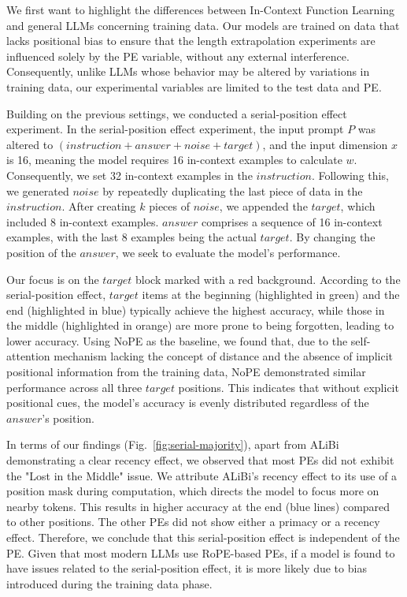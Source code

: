 \documentclass[letterpaper]{article} %
\begin{document}
We first want to highlight the differences between In-Context Function Learning and general LLMs concerning training data. Our models are trained on data that lacks positional bias to ensure that the length extrapolation experiments are influenced solely by the PE variable, without any external interference. Consequently, unlike LLMs whose behavior may be altered by variations in training data, our experimental variables are limited to the test data and PE.

Building on the previous settings, we conducted a serial-position effect experiment. In the serial-position effect experiment, the input prompt $P$ was altered to $(instruction + answer + noise + target)$, and the input dimension $x$ is 16, meaning the model requires 16 in-context examples to calculate $w$. Consequently, we set 32 in-context examples in the $instruction$. Following this, we generated $noise$ by repeatedly duplicating the last piece of data in the $instruction$. After creating $k$ pieces of $noise$, we appended the $target$, which included 8 in-context examples. $answer$ comprises a sequence of 16 in-context examples, with the last 8 examples being the actual $target$. By changing the position of the $answer$, we seek to evaluate the model's performance.

Our focus is on the $target$ block marked with a red background. According to the serial-position effect, $target$ items at the beginning (highlighted in green) and the end (highlighted in blue) typically achieve the highest accuracy, while those in the middle (highlighted in orange) are more prone to being forgotten, leading to lower accuracy. Using NoPE as the baseline, we found that, due to the self-attention mechanism lacking the concept of distance and the absence of implicit positional information from the training data, NoPE demonstrated similar performance across all three $target$ positions. This indicates that without explicit positional cues, the model's accuracy is evenly distributed regardless of the $answer$'s position.

In terms of our findings (Fig.~\ref{fig:serial-majority}), apart from ALiBi demonstrating a clear recency effect, we observed that most PEs did not exhibit the "Lost in the Middle" issue. We attribute ALiBi's recency effect to its use of a position mask during computation, which directs the model to focus more on nearby tokens. This results in higher accuracy at the end (blue lines) compared to other positions. The other PEs did not show either a primacy or a recency effect. Therefore, we conclude that this serial-position effect is independent of the PE. Given that most modern LLMs use RoPE-based PEs, if a model is found to have issues related to the serial-position effect, it is more likely due to bias introduced during the training data phase.
\end{document}
